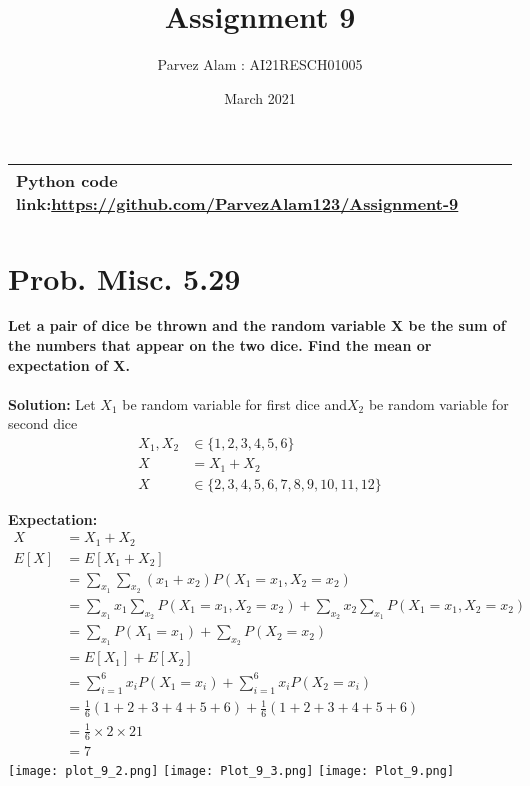 \documentclass{article}
\title{Assignment 9}
\author{Parvez Alam : AI21RESCH01005 }
\date{March 2021}
\begin{document}
\maketitle
\begin{multicols}{2}
\begin{center}
    \begin{tabular}{|p{5cm}|}
    \hline
        Python code link:\url{https://github.com/ParvezAlam123/Assignment-9} \\
        \hline
    \end{tabular}
\end{center}


\section{Prob. Misc. 5.29}
\textbf{Let a pair of dice be thrown and the random variable X be the sum of the numbers that appear on the two dice. Find the mean or expectation of X.} \\ \\
\textbf{Solution:} 
Let \(X_1\) be random variable for first dice and\( X_2\) be random variable for second dice
\begin{align}
    X_1, X_2 &\in \{1,2,3,4,5,6\}  \nonumber \\
    X &= X_1+X_2 \nonumber  \nonumber \\
    X &\in \{2,3,4,5,6,7,8,9,10,11,12\} \nonumber 
\end{align}

\textbf{Expectation:} \\
\begin{align}
    X &=X_1+X_2 \nonumber \\
    E[X] &=E[X_1+X_2] \nonumber \\
         &=\sum _{x_1} \sum _{x_2}(x_1+x_2)P(X_1=x_1,X_2=x_2) \nonumber \\
         &=\sum_{x_1}x_1 \sum_{x_2} P(X_1=x_1, X_2=x_2)+\sum_{x_2}x_2 \sum_{x_1}P(X_1=x_1,X_2=x_2) \nonumber \\
         &=\sum_{x_1}P(X_1=x_1)+\sum_{x_2}P(X_2=x_2) \nonumber \\
         &=E[X_1]+E[X_2] \nonumber \\
         &=\sum _{i=1}^6x_iP(X_1=x_i)+\sum _{i=1}^6x_iP(X_2=x_i) \nonumber \\
         &=\frac{1}{6}(1+2+3+4+5+6)+\frac{1}{6}(1+2+3+4+5+6) \nonumber \\
         &=\frac{1}{6}\times 2 \times 21 \nonumber \\
         &=7 \nonumber
\end{align}
\texttt{[image: plot\_9\_2.png]}
\texttt{[image: Plot\_9\_3.png]}
\texttt{[image: Plot\_9.png]}



\end{multicols}
\end{document}
